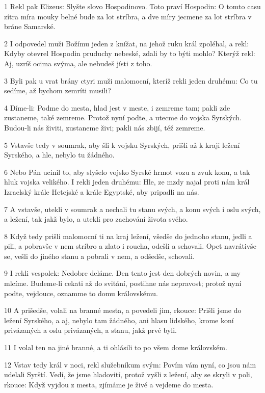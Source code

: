 \par 1 Rekl pak Elizeus: Slyšte slovo Hospodinovo. Toto praví Hospodin: O tomto casu zítra míra mouky belné bude za lot stríbra, a dve míry jecmene za lot stríbra v bráne Samarské.
\par 2 I odpovedel muži Božímu jeden z knížat, na jehož ruku král zpoléhal, a rekl: Kdyby otevrel Hospodin pruduchy nebeské, zdali by to býti mohlo? Kterýž rekl: Aj, uzríš ocima svýma, ale nebudeš jísti z toho.
\par 3 Byli pak u vrat brány ctyri muži malomocní, kteríž rekli jeden druhému: Co tu sedíme, až bychom zemríti musili?
\par 4 Díme-li: Podme do mesta, hlad jest v meste, i zemreme tam; pakli zde zustaneme, také zemreme. Protož nyní podte, a utecme do vojska Syrských. Budou-li nás živiti, zustaneme živi; pakli nás zbijí, též zemreme.
\par 5 Vstavše tedy v soumrak, aby šli k vojsku Syrských, prišli až k kraji ležení Syrského, a hle, nebylo tu žádného.
\par 6 Nebo Pán ucinil to, aby slyšelo vojsko Syrské hrmot vozu a zvuk konu, a tak hluk vojska velikého. I rekli jeden druhému: Hle, ze mzdy najal proti nám král Izraelský krále Hetejské a krále Egyptské, aby pripadli na nás.
\par 7 A vstavše, utekli v soumrak a nechali tu stanu svých, a konu svých i oslu svých, a ležení, tak jakž bylo, a utekli pro zachování života svého.
\par 8 Když tedy prišli malomocní ti na kraj ležení, všedše do jednoho stanu, jedli a pili, a pobravše v nem stríbro a zlato i roucha, odešli a schovali. Opet navrátivše se, vešli do jiného stanu a pobrali v nem, a odšedše, schovali.
\par 9 I rekli vespolek: Nedobre deláme. Den tento jest den dobrých novin, a my mlcíme. Budeme-li cekati až do svitání, postihne nás nepravost; protož nyní podte, vejdouce, oznamme to domu královskému.
\par 10 A prišedše, volali na branné mesta, a povedeli jim, rkouce: Prišli jsme do ležení Syrského, a aj, nebylo tam žádného, ani hlasu lidského, krome koní privázaných a oslu privázaných, a stanu, jakž prvé byli.
\par 11 I volal ten na jiné branné, a ti ohlásili to po všem dome královském.
\par 12 Vstav tedy král v noci, rekl služebníkum svým: Povím vám nyní, co jsou nám udelali Syrští. Vedí, že jsme hladovití, protož vyšli z ležení, aby se skryli v poli, rkouce: Když vyjdou z mesta, zjímáme je živé a vejdeme do mesta.
